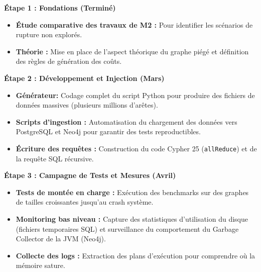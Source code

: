 \documentclass{article}
\begin{document}
    \begin{description}

        \item \textbf{Étape 1 : Fondations (Terminé)}
            
            \begin{itemize}

                \item \textbf{Étude comparative des travaux de M2 :} Pour identifier les scénarios de rupture non explorés.
                \item \textbf{Théorie :} Mise en place de l'aspect théorique du graphe piégé et définition des règles de génération des coûts.

            
            \end{itemize}

        \item \textbf{Étape 2 : Développement et Injection (Mars)}
            \begin{itemize}

                \item \textbf{Générateur:} Codage complet du script Python pour produire des fichiers de données massives (plusieurs millions d'arêtes).
                \item \textbf{Scripts d'ingestion :} Automatisation du chargement des données vers PostgreSQL et Neo4j pour garantir des tests reproductibles.
                \item \textbf{Écriture des requêtes :} Construction du code Cypher 25 (\texttt{allReduce}) et de la requête SQL récursive.
            
            \end{itemize}

        \item \textbf{Étape 3 : Campagne de Tests et Mesures (Avril)}
            \begin{itemize}

                \item \textbf{Tests de montée en charge :} Exécution des benchmarks sur des graphes de tailles croissantes jusqu'au crash système.
                \item \textbf{Monitoring bas niveau :} Capture des statistiques d'utilisation du disque (fichiers temporaires SQL) et surveillance du comportement du Garbage Collector de la JVM (Neo4j).
                \item \textbf{Collecte des logs :} Extraction des plans d'exécution pour comprendre où la mémoire sature.
            

\end{itemize}
\end{description}
\end{document}
